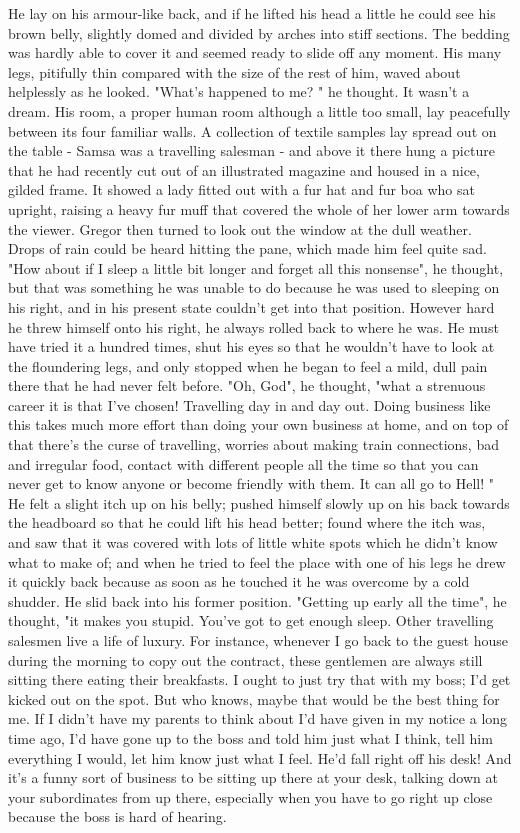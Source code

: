 \documentclass[listoffigures, listoftables]{ifathesis}
\begin{document}
He lay on his armour-like back, and if he lifted his head a little he could see his brown belly, slightly domed and divided by arches into stiff sections. The bedding was hardly able to cover it and seemed ready to slide off any moment. His many legs, pitifully thin compared with the size of the rest of him, waved about helplessly as he looked. "What's happened to me? " he thought. It wasn't a dream. His room, a proper human room although a little too small, lay peacefully between its four familiar walls. A collection of textile samples lay spread out on the table - Samsa was a travelling salesman - and above it there hung a picture that he had recently cut out of an illustrated magazine and housed in a nice, gilded frame. It showed a lady fitted out with a fur hat and fur boa who sat upright, raising a heavy fur muff that covered the whole of her lower arm towards the viewer. Gregor then turned to look out the window at the dull weather. Drops of rain could be heard hitting the pane, which made him feel quite sad. "How about if I sleep a little bit longer and forget all this nonsense", he thought, but that was something he was unable to do because he was used to sleeping on his right, and in his present state couldn't get into that position. However hard he threw himself onto his right, he always rolled back to where he was. He must have tried it a hundred times, shut his eyes so that he wouldn't have to look at the floundering legs, and only stopped when he began to feel a mild, dull pain there that he had never felt before. "Oh, God", he thought, "what a strenuous career it is that I've chosen! Travelling day in and day out. Doing business like this takes much more effort than doing your own business at home, and on top of that there's the curse of travelling, worries about making train connections, bad and irregular food, contact with different people all the time so that you can never get to know anyone or become friendly with them. It can all go to Hell! " He felt a slight itch up on his belly; pushed himself slowly up on his back towards the headboard so that he could lift his head better; found where the itch was, and saw that it was covered with lots of little white spots which he didn't know what to make of; and when he tried to feel the place with one of his legs he drew it quickly back because as soon as he touched it he was overcome by a cold shudder. He slid back into his former position. "Getting up early all the time", he thought, "it makes you stupid. You've got to get enough sleep. Other travelling salesmen live a life of luxury. For instance, whenever I go back to the guest house during the morning to copy out the contract, these gentlemen are always still sitting there eating their breakfasts. I ought to just try that with my boss; I'd get kicked out on the spot. But who knows, maybe that would be the best thing for me. If I didn't have my parents to think about I'd have given in my notice a long time ago, I'd have gone up to the boss and told him just what I think, tell him everything I would, let him know just what I feel. He'd fall right off his desk! And it's a funny sort of business to be sitting up there at your desk, talking down at your subordinates from up there, especially when you have to go right up close because the boss is hard of hearing. 
\end{document}
